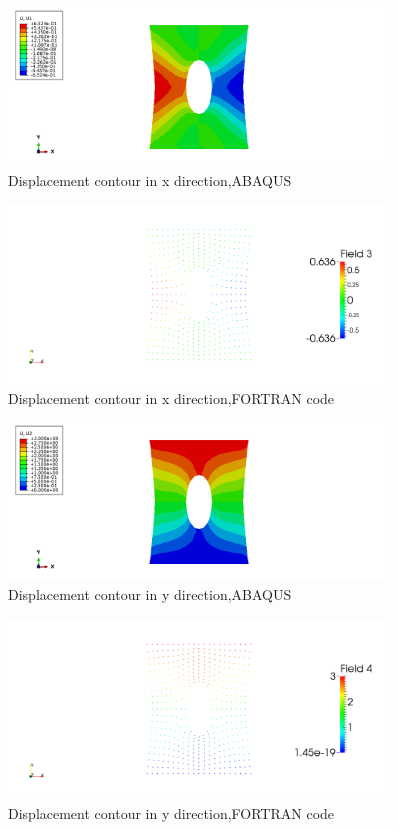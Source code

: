 \documentclass[review]{elsarticle}
\begin{document}
\begin{figure}[ht!]
\centering
\includegraphics[width=0.9\textwidth]{u1_abq.png}
\caption{Displacement contour in x direction,ABAQUS}
\label{u1_abq}
\end{figure}

\begin{figure}[ht!]
\centering
\includegraphics[width=0.9\textwidth]{u11.png}
\caption{Displacement contour in x direction,FORTRAN code}
\label{u1}
\end{figure}

\begin{figure}[ht!]
\centering
\includegraphics[width=0.9\textwidth]{u2_abq.png}
\caption{Displacement contour in y direction,ABAQUS}
\label{u2_abq}
\end{figure}

\begin{figure}
\centering
\includegraphics[width=0.9\textwidth]{u21.png}
\caption{Displacement contour in y direction,FORTRAN code}
\label{u2}
\end{figure}
\end{document}
